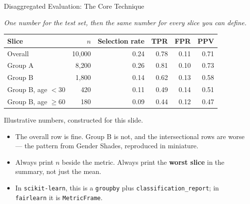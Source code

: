
\begin{frame}{Disaggregated Evaluation: The Core Technique}

    \textit{One number for the test set, then the same number for every slice you can define.}

    \vspace{0.7em}
    \centering
    \scriptsize
    \begin{tabular}{lrrrrr}
        \toprule
        \textbf{Slice} & \textbf{$n$} & \textbf{Selection rate} & \textbf{TPR} & \textbf{FPR} & \textbf{PPV} \\
        \midrule
        Overall            & 10{,}000 & 0.24 & 0.78 & 0.11 & 0.71 \\
        \midrule
        Group A            &  8{,}200 & 0.26 & 0.81 & 0.10 & 0.73 \\
        Group B            &  1{,}800 & 0.14 & 0.62 & 0.13 & 0.58 \\
        \midrule
        Group B, age $<30$ &    420   & 0.11 & 0.49 & 0.14 & 0.51 \\
        Group B, age $\geq 60$ &  180 & 0.09 & 0.44 & 0.12 & 0.47 \\
        \bottomrule
    \end{tabular}

    \vspace{0.5em}
    {\scriptsize Illustrative numbers, constructed for this slide.}

    \vspace{0.8em}
    \raggedright
    \begin{itemize}\scriptsize
        \setlength\itemsep{0.35em}
        \item The overall row is fine. Group B is not, and the intersectional rows are worse ---
              the pattern from Gender Shades, reproduced in miniature.
        \item Always print \textbf{$n$} beside the metric. Always print the \textbf{worst slice}
              in the summary, not just the mean.
        \item In \texttt{scikit-learn}, this is a \texttt{groupby} plus
              \texttt{classification\_report}; in \texttt{fairlearn} it is \texttt{MetricFrame}.
    \end{itemize}
\end{frame}
